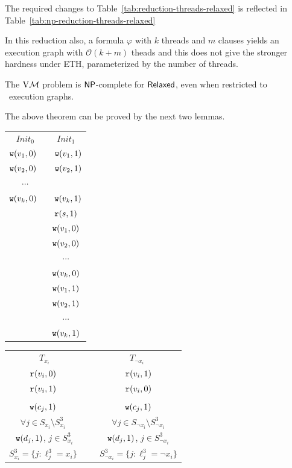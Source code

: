 The required changes to Table~\ref{tab:reduction-threads-relaxed} is reflected in Table~\ref{tab:np-reduction-threads-relaxed}

In this reduction also, a formula $\varphi$ with $k$ threads and $m$ clauses yields an execution graph with $\mathcal{O}(k + m)$ theads and this does not give the stronger hardness under ETH, parameterized by the number of threads. 

\begin{theorem}
\label{thm:relaxed-two-writer-hardness}
    The $\mathrm{V}\mathcal{M}$ problem is $\mathsf{NP}$-complete for $\mathsf{Relaxed}$, even when restricted to \twowriter\ execution graphs.
\end{theorem}

The above theorem can be proved by the next two lemmas.

\begin{table}[h]
    
\noindent
\begin{minipage}{0.17\textwidth}
\centering
\begin{tabular}{c | c}
    $Init_0$ & $Init_1$ \\
    $\mathtt{w}(v_1, 0)$~& ~$\mathtt{w}(v_1, 1)$ \\
    $\mathtt{w}(v_2, 0)$~ & ~$\mathtt{w}(v_2, 1)$ \\
    $\cdots$ \\
    $\mathtt{w}(v_k, 0)$~ & ~$\mathtt{w}(v_k, 1)$\\
    & $\mathtt{r}(s, 1)$ \\
    & $\mathtt{w}(v_1, 0)$ \\
    & $\mathtt{w}(v_2, 0)$ \\
    & $\cdots$ \\
    & $\mathtt{w}(v_k, 0)$ \\
    & $\mathtt{w}(v_1, 1)$ \\
    & $\mathtt{w}(v_2, 1)$ \\
    & $\cdots$ \\
    & $\mathtt{w}(v_k, 1)$ \\
    
\end{tabular}
\end{minipage}
\hfill
\begin{minipage}{0.35\textwidth}
\centering
\begin{tabular}{c | c}
    $T_{x_i}$~ & ~$T_{\neg x_i}$ \\
        $\mathtt{r}(v_i, 0)$ ~&~  $\mathtt{r}(v_i, 1)$ \\
        $\mathtt{r}(v_i, 1)$ ~&~ $\mathtt{r}(v_i, 0)$ \\
        & \\        
        $\mathtt{w}(c_j, 1)$ ~&~ $\mathtt{w}(c_j, 1)$ \\
        $\forall j \in S_{x_i}\setminus S_{x_i}^{3}$ ~&~  $\forall j \in S_{\neg x_i}\setminus S_{\neg x_i}^{3}$\\
        $\mathtt{w}(d_j,1)$, $j\in S_{x_i}^{3}$~&~ $\mathtt{w}(d_j,1)$, $j\in S_{\neg x_i}^{3}$\\
        \scriptsize $S_{x_i}^{3}=\{j:\ell_j^3=x_i\}$ ~&~  \scriptsize $S_{\neg x_i}^{3}=\{j:\ell_j^3=\neg x_i\}$
        

\end{tabular}
\end{minipage}
\end{table}
